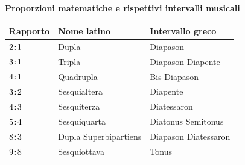 

\bigskip
\begin{center}
\textbf{Proporzioni matematiche e rispettivi intervalli musicali}\\[4pt]
\begin{tabular}{@{}lll@{}}
\toprule
Rapporto & Nome latino & Intervallo greco \\
\midrule
$2\!:\!1$ & Dupla            & Diapason \\
$3\!:\!1$ & Tripla           & Diapason Diapente \\
$4\!:\!1$ & Quadrupla        & Bis Diapason \\
$3\!:\!2$ & Sesquialtera     & Diapente \\
$4\!:\!3$ & Sesquiterza      & Diatessaron \\
$5\!:\!4$ & Sesquiquarta     & Diatonus Semitonus \\
$8\!:\!3$ & Dupla Superbipartiens & Diapason Diatessaron \\
$9\!:\!8$ & Sesquiottava     & Tonus \\
\bottomrule
\end{tabular}
\end{center}
